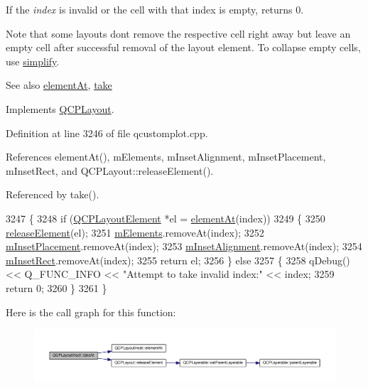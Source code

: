 If the {\itshape index} is invalid or the cell with that index is empty, returns 0.

Note that some layouts don\textquotesingle{}t remove the respective cell right away but leave an empty cell after successful removal of the layout element. To collapse empty cells, use \hyperlink{class_q_c_p_layout_inset_abb9eb23bf2d7c587a8abe02d065eae0a}{simplify}.

\begin{DoxySeeAlso}{See also}
\hyperlink{class_q_c_p_layout_inset_ab096d07b08f9b5455647f3ba7ff60e27}{element\+At}, \hyperlink{class_q_c_p_layout_inset_a9ac707ccff650633b97f52dd5cddcf49}{take} 
\end{DoxySeeAlso}


Implements \hyperlink{class_q_c_p_layout_a5a79621fa0a6eabb8b520cfc04fb601a}{Q\+C\+P\+Layout}.



Definition at line 3246 of file qcustomplot.\+cpp.



References element\+At(), m\+Elements, m\+Inset\+Alignment, m\+Inset\+Placement, m\+Inset\+Rect, and Q\+C\+P\+Layout\+::release\+Element().



Referenced by take().


\begin{DoxyCode}
3247 \{
3248   \textcolor{keywordflow}{if} (\hyperlink{class_q_c_p_layout_element}{QCPLayoutElement} *el = \hyperlink{class_q_c_p_layout_inset_ab096d07b08f9b5455647f3ba7ff60e27}{elementAt}(index))
3249   \{
3250     \hyperlink{class_q_c_p_layout_a4afbb4bef0071f72f91afdac4433a18e}{releaseElement}(el);
3251     \hyperlink{class_q_c_p_layout_inset_a8fff7eae9a1be9a5c1e544fb379f682f}{mElements}.removeAt(index);
3252     \hyperlink{class_q_c_p_layout_inset_a57a0a4e445cc78eada29765ecf092abe}{mInsetPlacement}.removeAt(index);
3253     \hyperlink{class_q_c_p_layout_inset_a55e9b84c310136ff985a6544184ab64a}{mInsetAlignment}.removeAt(index);
3254     \hyperlink{class_q_c_p_layout_inset_aaa8f6b5029458f3d97a65239524a2b33}{mInsetRect}.removeAt(index);
3255     \textcolor{keywordflow}{return} el;
3256   \} \textcolor{keywordflow}{else}
3257   \{
3258     qDebug() << Q\_FUNC\_INFO << \textcolor{stringliteral}{"Attempt to take invalid index:"} << index;
3259     \textcolor{keywordflow}{return} 0;
3260   \}
3261 \}
\end{DoxyCode}


Here is the call graph for this function\+:\nopagebreak
\begin{figure}[H]
\begin{center}
\leavevmode
\includegraphics[width=350pt]{class_q_c_p_layout_inset_ad6756a3b507e20496aaf7f5ca16c47d1_cgraph}
\end{center}
\end{figure}




